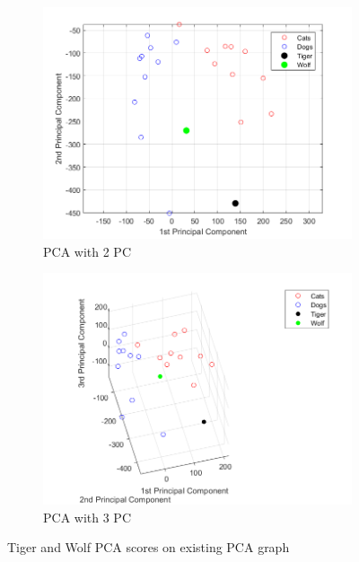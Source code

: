 \documentclass[a4paper]{iacas}
\begin{document}
\vskip 0.1in
\begin{figure}[!htbp]
	\begin{subfigure}{0.8\linewidth}
		\centering
		\includegraphics[width=\linewidth]{imgs/scatter_2d_tiger_wolf.png}
		\caption{PCA with 2 PC}
	\end{subfigure}
	\vskip 0.1in
	\begin{subfigure}{0.8\linewidth}
		\centering
		\includegraphics[width=\linewidth]{imgs/scatter_3d_tiger_wolf.png}
		\caption{PCA with 3 PC}
	\end{subfigure}
	\caption{Tiger and Wolf PCA scores on existing PCA graph}
	\label{PCA_tiger_wolf}
\end{figure}
\vskip 0.1in
\end{document}
